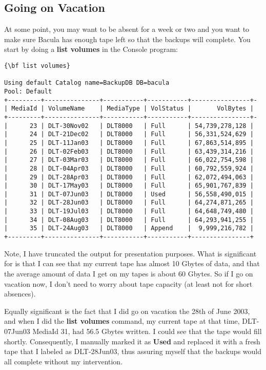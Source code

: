 {\subsection*{Going on Vacation}
\label{Vacation}

At some point, you may want to be absent for a week or two and you want to
make sure Bacula has enough tape left so that the backups will complete. You
start by doing a {\bf list volumes} in the Console program: 

\footnotesize
\begin{verbatim}
{\bf list volumes}
 
Using default Catalog name=BackupDB DB=bacula
Pool: Default
+---------+---------------+-----------+-----------+----------------+-
| MediaId | VolumeName    | MediaType | VolStatus |       VolBytes |
+---------+---------------+-----------+-----------+----------------+-
|      23 | DLT-30Nov02   | DLT8000   | Full      | 54,739,278,128 |
|      24 | DLT-21Dec02   | DLT8000   | Full      | 56,331,524,629 |
|      25 | DLT-11Jan03   | DLT8000   | Full      | 67,863,514,895 |
|      26 | DLT-02Feb03   | DLT8000   | Full      | 63,439,314,216 |
|      27 | DLT-03Mar03   | DLT8000   | Full      | 66,022,754,598 |
|      28 | DLT-04Apr03   | DLT8000   | Full      | 60,792,559,924 |
|      29 | DLT-28Apr03   | DLT8000   | Full      | 62,072,494,063 |
|      30 | DLT-17May03   | DLT8000   | Full      | 65,901,767,839 |
|      31 | DLT-07Jun03   | DLT8000   | Used      | 56,558,490,015 |
|      32 | DLT-28Jun03   | DLT8000   | Full      | 64,274,871,265 |
|      33 | DLT-19Jul03   | DLT8000   | Full      | 64,648,749,480 |
|      34 | DLT-08Aug03   | DLT8000   | Full      | 64,293,941,255 |
|      35 | DLT-24Aug03   | DLT8000   | Append    |  9,999,216,782 |
+---------+---------------+-----------+-----------+----------------+
\end{verbatim}
\normalsize

Note, I have truncated the output for presentation purposes. What is
significant for is that I can see that my current tape has almost 10 Gbytes of
data, and that the average amount of data I get on my tapes is about 60
Gbytes. So if I go on vacation now, I don't need to worry about tape capacity
(at least not for short absences). 

Equally significant is the fact that I did go on vacation the 28th of June
2003, and when I did the {\bf list volumes} command, my current tape at that
time, DLT-07Jun03 MediaId 31, had 56.5 Gbytes written. I could see that the
tape would fill shortly. Consequently, I manually marked it as {\bf Used} and
replaced it with a fresh tape that I labeled as DLT-28Jun03, thus assuring
myself that the backups would all complete without my intervention. 

}
